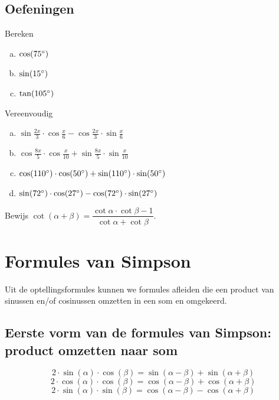 \documentclass[a4paper,12pt]{article}
\begin{document}
\subsection{Oefeningen}

\begin{oefening}
Bereken
\begin{enumerate}[(a)]
  \item $\cos(75^\circ)$
  \item $\sin(15^\circ)$
  \item $\tan(105^\circ)$
\end{enumerate}
\end{oefening}

\begin{oefening}
Vereenvoudig
\begin{enumerate}[(a)]
  \item $\sin\frac{2x}{3}\cdot \cos\frac{x}{6}-\cos\frac{2x}{3}\cdot \sin\frac{x}{6}$
  \item $\cos\frac{8x}{5}\cdot \cos\frac{x}{10}+\sin\frac{8x}{5}\cdot \sin\frac{x}{10}$
  \item $\cos(110^\circ)\cdot \cos(50^\circ)+\sin(110^\circ)\cdot \sin(50^\circ)$
  \item $\sin(72^\circ)\cdot \cos(27^\circ)-\cos(72^\circ)\cdot \sin(27^\circ)$
\end{enumerate}
\end{oefening}

\begin{oefening}
Bewijs $\displaystyle \cot(\alpha+\beta)=\dfrac{\cot\alpha\cdot\cot\beta-1}{\cot\alpha+\cot\beta}$.
\end{oefening}

\newpage
\section{Formules van Simpson}
Uit de optellingsformules kunnen we formules afleiden die een product van sinussen en/of cosinussen omzetten in een som en omgekeerd.
\subsection{Eerste vorm van de formules van Simpson: product omzetten naar som}
\[2\cdot \sin(\alpha)\cdot \cos(\beta)=\sin(\alpha-\beta)+\sin(\alpha+\beta)
\]
\[2\cdot \cos(\alpha)\cdot \cos(\beta)=\cos(\alpha-\beta)+\cos(\alpha+\beta)
\]
\[2\cdot \sin(\alpha)\cdot \sin(\beta)=\cos(\alpha-\beta)-\cos(\alpha+\beta)
\]
\end{document}
